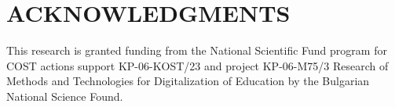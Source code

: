 \documentclass[a4paper,twocolumn,10pt]{article}
\begin{document}
\section{ACKNOWLEDGMENTS}

This research is granted funding from the National Scientific Fund program for COST actions support KP-06-KOST/23 and project KP-06-M75/3 Research of Methods and Technologies for Digitalization of Education by the Bulgarian National Science Found.



\end{document}
